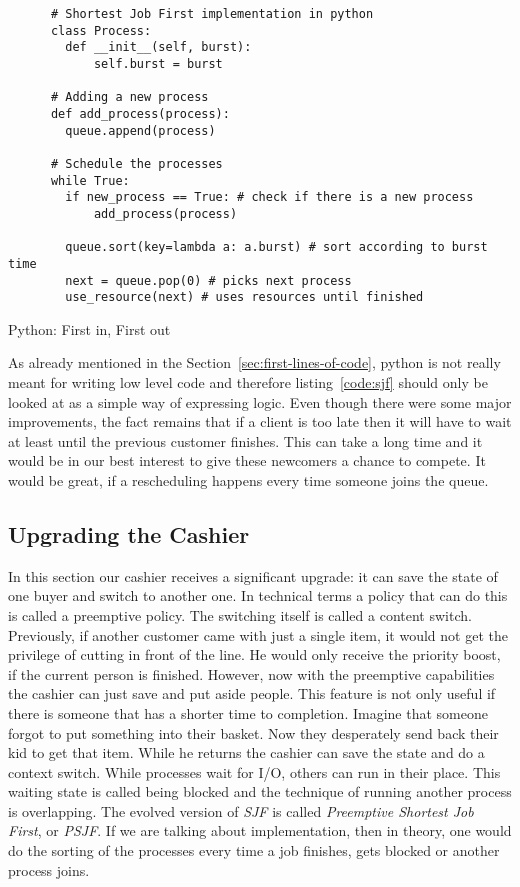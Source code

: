 \begin{listing}[h]
    \begin{verbatim}
      # Shortest Job First implementation in python
      class Process:
        def __init__(self, burst):
            self.burst = burst

      # Adding a new process
      def add_process(process):
        queue.append(process)

      # Schedule the processes
      while True:
        if new_process == True: # check if there is a new process
            add_process(process)
        
        queue.sort(key=lambda a: a.burst) # sort according to burst time
        next = queue.pop(0) # picks next process
        use_resource(next) # uses resources until finished
    \end{verbatim}
    \caption{Python: First in, First out}
    \label{code:sjf}
\end{listing}

As already mentioned in the Section~\ref{sec:first-lines-of-code}, python is not really meant for writing low level code and therefore listing~\ref{code:sjf} should only be looked at as a simple way of expressing logic.
Even though there were some major improvements, the fact remains that if a client is too late then it will have to wait at least  until the previous customer finishes. This can take a long time and it would be in our best interest to give these newcomers a chance to compete.
It would be great, if a rescheduling happens every time someone joins the queue.

\subsection{Upgrading the Cashier}

In this section our cashier receives a significant upgrade: it can save the state of one buyer and switch to another one.
In technical terms a policy that can do this is called a preemptive policy.
The switching itself is called a content switch.
Previously, if another customer came with just a single item, it would not get the privilege of cutting in front of the line.
He would only receive the priority boost, if the current person is finished.
However, now with the preemptive capabilities the cashier can just save and put aside people.
This feature is not only useful if there is someone that has a shorter time to completion.
Imagine that someone forgot to put something into their basket.
Now they desperately send back their kid to get that item. While he returns the cashier can save the state and do a context switch.
While processes wait for I/O, others can run in their place.
This waiting state is called being blocked and the technique of running another process is overlapping.
The evolved version of \emph{SJF} is called \emph{Preemptive Shortest Job First}, or \emph{PSJF}.
If we are talking about implementation, then in theory, one would do the sorting of the processes every time a job finishes, gets blocked or another process joins.

